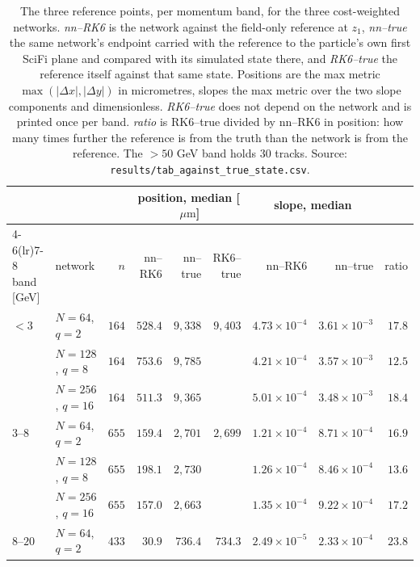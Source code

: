 \documentclass[11pt,a4paper]{article}
\newcommand{\um}{\ensuremath{\,\mu\mathrm{m}}}
\begin{document}
\begin{table}[tbp]
  \centering
  \caption{The three reference points, per momentum band, for the three
  cost-weighted networks. \emph{nn--RK6} is the network against the field-only
  reference at $z_1$, \emph{nn--true} the same network's endpoint carried with
  the reference to the particle's own first SciFi plane and compared with its
  simulated state there, and \emph{RK6--true} the reference itself against that
  same state. Positions are the max metric $\max(|\Delta x|, |\Delta y|)$ in
  micrometres, slopes the max metric over the two slope components and
  dimensionless. \emph{RK6--true} does not depend on the network and is printed
  once per band. \emph{ratio} is RK6--true divided by nn--RK6 in position: how
  many times further the reference is from the truth than the network is from
  the reference. The $>50$ GeV band holds $30$ tracks. Source:
  \texttt{results/tab\_against\_true\_state.csv}.}
  \label{tab:truth}
  \footnotesize
  \setlength{\tabcolsep}{4pt}
  \begin{tabular}{llrrrrrrr}
    \toprule
    & & & \multicolumn{3}{c}{position, median [\!\um]}
        & \multicolumn{2}{c}{slope, median} & \\
    \cmidrule(lr){4-6}\cmidrule(lr){7-8}
    band [GeV] & network & $n$ & nn--RK6 & nn--true & RK6--true
      & nn--RK6 & nn--true & ratio \\
    \midrule
    $<3$ & $N = 64$, $q = 2$  & $164$ & $528.4$ & $9{,}338$ & $9{,}403$ & $4.73\times10^{-4}$ & $3.61\times10^{-3}$ & $17.8$ \\
         & $N = 128$, $q = 8$ & $164$ & $753.6$ & $9{,}785$ &           & $4.21\times10^{-4}$ & $3.57\times10^{-3}$ & $12.5$ \\
         & $N = 256$, $q = 16$& $164$ & $511.3$ & $9{,}365$ &           & $5.01\times10^{-4}$ & $3.48\times10^{-3}$ & $18.4$ \\
    \addlinespace
    $3$--$8$ & $N = 64$, $q = 2$  & $655$ & $159.4$ & $2{,}701$ & $2{,}699$ & $1.21\times10^{-4}$ & $8.71\times10^{-4}$ & $16.9$ \\
             & $N = 128$, $q = 8$ & $655$ & $198.1$ & $2{,}730$ &           & $1.26\times10^{-4}$ & $8.46\times10^{-4}$ & $13.6$ \\
             & $N = 256$, $q = 16$& $655$ & $157.0$ & $2{,}663$ &           & $1.35\times10^{-4}$ & $9.22\times10^{-4}$ & $17.2$ \\
    \addlinespace
    $8$--$20$ & $N = 64$, $q = 2$  & $433$ & $30.9$ & $736.4$ & $734.3$ & $2.49\times10^{-5}$ & $2.33\times10^{-4}$ & $23.8$ \\

\end{tabular}
\end{table}
\end{document}
